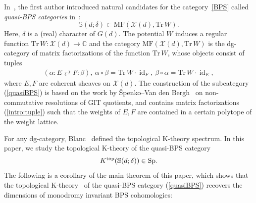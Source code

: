 \documentclass [11pt,oneside,a4paper,mathscr]{amsart}
\theoremstyle{definition}
\newcommand{\X}{\mathscr{X}}
\newcommand{\id}{\operatorname{id}}
\begin{document}
In~\cite{P}, 
the first author 
introduced 
natural candidates for the category~\eqref{BPS}
called \textit{quasi-BPS categories} in~\cite{PTzero}:
\begin{equation}\label{quasiBPS}
\mathbb{S}(d; \delta)\subset \mathrm{MF}(\X(d), \mathrm{Tr}\,W).
\end{equation}
Here, 
$\delta$ is a (real) character of $G(d)$. The 
potential $W$ induces a regular function 
$\mathrm{Tr}\,W\colon \X(d)\to\mathbb{C}$
and the category $\mathrm{MF}(\X(d), \mathrm{Tr}\,W)$ is the 
dg-category of matrix factorizations of the function 
$\mathrm{Tr}\,W$, whose objects 
consist of tuples
\begin{align}\label{intro:tuple}
    (\alpha \colon E \rightleftarrows F \colon \beta), \ 
    \alpha \circ \beta=\mathrm{Tr}\,W \cdot \id_F, \ 
    \beta \circ \alpha=\mathrm{Tr}\,W \cdot \id_E,
\end{align}
where $E, F$ are coherent sheaves on $\X(d)$. 
The construction of the subcategory (\ref{quasiBPS}) 
is based on the 
work by \v{S}penko--Van den Bergh~\cite{SVdB}
on non-commutative 
resolutions of GIT quotients, and contains matrix factorizations (\ref{intro:tuple}) 
such that the weights of $E, F$
are contained in a certain polytope of the weight lattice. 

For any dg-category, Blanc~\cite{Blanc} defined the topological K-theory spectrum. 
In this paper, we study the topological K-theory of the quasi-BPS category 
\begin{align*}
    K^{\rm{top}}(\mathbb{S}(d; \delta)) \in \mathrm{Sp}. 
\end{align*}
 The following is a corollary of the main theorem of this paper, which shows that the topological 
K-theory~\cite{Blanc} 
of the quasi-BPS category (\ref{quasiBPS})
recovers the dimensions of monodromy 
invariant BPS cohomologies:
\end{document}
